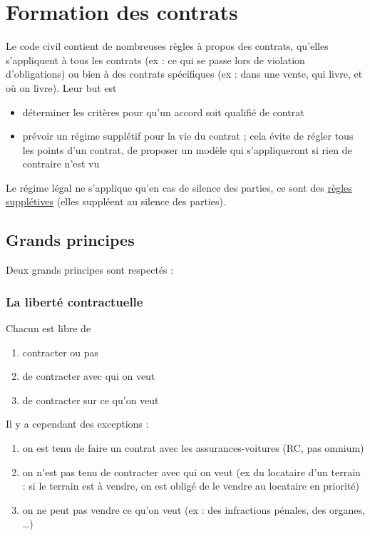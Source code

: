 	\section{Formation des contrats}
	
	Le code civil contient de nombreuses règles à propos des contrats, qu'elles s'appliquent à tous les contrats (ex : ce qui se passe lors de violation d'obligations) ou bien à des contrats spécifiques (ex : dans une vente, qui livre, et où on livre). Leur but est 
	
	\begin{itemize}
		\item déterminer les critères pour qu'un accord soit qualifié de contrat
		\item prévoir un régime supplétif pour la vie du contrat ; cela évite de régler tous les points d'un contrat, de proposer un modèle qui s'appliqueront si rien de contraire n'est vu
	\end{itemize}	
	
	Le régime légal ne s'applique qu'en cas de silence des parties, ce sont des \underline{règles supplétives} (elles suppléent au silence des parties).
	
	
		\subsection{Grands principes}	
	
	Deux grands principes sont respectés :
	
			\subsubsection{La liberté contractuelle}
			
			Chacun est libre de 
		
			\begin{enumerate}
				\item contracter ou pas
				\item de contracter avec qui on veut
				\item  de contracter sur ce qu'on veut
			\end{enumerate}
		
			Il y a cependant des exceptions :
		
			\begin{enumerate}
				\item on est tenu de faire un contrat avec les assurances-voitures (RC, pas omnium)
				\item on n'est pas tenu de contracter avec qui on veut (ex du locataire d'un terrain : si le terrain est à vendre, on est obligé de le vendre au locataire en priorité)
				\item on ne peut pas vendre ce qu'on veut (ex : des infractions pénales, des organes, \dots )
			\end{enumerate}
		
